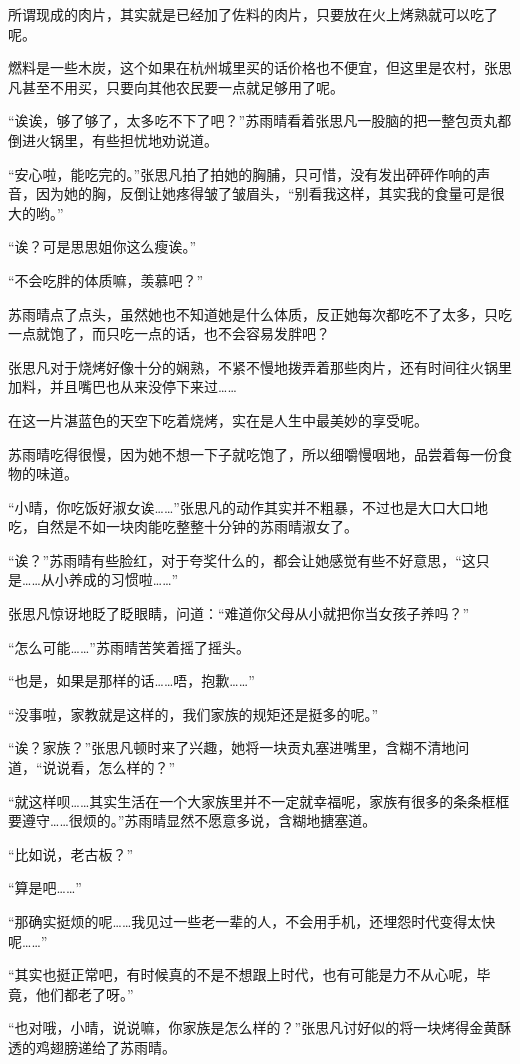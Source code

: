 所谓现成的肉片，其实就是已经加了佐料的肉片，只要放在火上烤熟就可以吃了呢。

燃料是一些木炭，这个如果在杭州城里买的话价格也不便宜，但这里是农村，张思凡甚至不用买，只要向其他农民要一点就足够用了呢。

“诶诶，够了够了，太多吃不下了吧？”苏雨晴看着张思凡一股脑的把一整包贡丸都倒进火锅里，有些担忧地劝说道。

“安心啦，能吃完的。”张思凡拍了拍她的胸脯，只可惜，没有发出砰砰作响的声音，因为她的胸，反倒让她疼得皱了皱眉头，“别看我这样，其实我的食量可是很大的哟。”

“诶？可是思思姐你这么瘦诶。”

“不会吃胖的体质嘛，羡慕吧？”

苏雨晴点了点头，虽然她也不知道她是什么体质，反正她每次都吃不了太多，只吃一点就饱了，而只吃一点的话，也不会容易发胖吧？

张思凡对于烧烤好像十分的娴熟，不紧不慢地拨弄着那些肉片，还有时间往火锅里加料，并且嘴巴也从来没停下来过……

在这一片湛蓝色的天空下吃着烧烤，实在是人生中最美妙的享受呢。

苏雨晴吃得很慢，因为她不想一下子就吃饱了，所以细嚼慢咽地，品尝着每一份食物的味道。

“小晴，你吃饭好淑女诶……”张思凡的动作其实并不粗暴，不过也是大口大口地吃，自然是不如一块肉能吃整整十分钟的苏雨晴淑女了。

“诶？”苏雨晴有些脸红，对于夸奖什么的，都会让她感觉有些不好意思，“这只是……从小养成的习惯啦……”

张思凡惊讶地眨了眨眼睛，问道：“难道你父母从小就把你当女孩子养吗？”

“怎么可能……”苏雨晴苦笑着摇了摇头。

“也是，如果是那样的话……唔，抱歉……”

“没事啦，家教就是这样的，我们家族的规矩还是挺多的呢。”

“诶？家族？”张思凡顿时来了兴趣，她将一块贡丸塞进嘴里，含糊不清地问道，“说说看，怎么样的？”

“就这样呗……其实生活在一个大家族里并不一定就幸福呢，家族有很多的条条框框要遵守……很烦的。”苏雨晴显然不愿意多说，含糊地搪塞道。

“比如说，老古板？”

“算是吧……”

“那确实挺烦的呢……我见过一些老一辈的人，不会用手机，还埋怨时代变得太快呢……”

“其实也挺正常吧，有时候真的不是不想跟上时代，也有可能是力不从心呢，毕竟，他们都老了呀。”

“也对哦，小晴，说说嘛，你家族是怎么样的？”张思凡讨好似的将一块烤得金黄酥透的鸡翅膀递给了苏雨晴。

